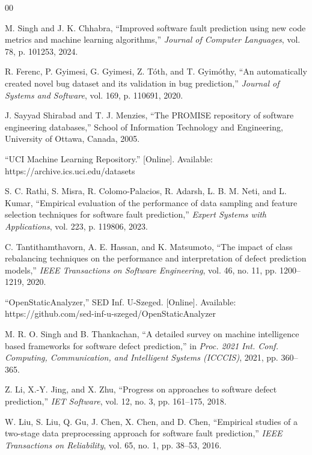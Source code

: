\documentclass[conference,a4paper]{IEEEtran}
\begin{document}
\begin{thebibliography}{00}

 M. Singh and J. K. Chhabra, ``Improved software fault prediction using new code metrics and machine learning algorithms,'' \textit{Journal of Computer Languages}, vol. 78, p. 101253, 2024.

 R. Ferenc, P. Gyimesi, G. Gyimesi, Z. T{\'o}th, and T. Gyim{\'o}thy, ``An automatically created novel bug dataset and its validation in bug prediction,'' \textit{Journal of Systems and Software}, vol. 169, p. 110691, 2020.

 J. Sayyad Shirabad and T. J. Menzies, ``The PROMISE repository of software engineering databases,'' School of Information Technology and Engineering, University of Ottawa, Canada, 2005.

 ``UCI Machine Learning Repository.'' [Online]. Available: https://archive.ics.uci.edu/datasets

 S. C. Rathi, S. Misra, R. Colomo-Palacios, R. Adarsh, L. B. M. Neti, and L. Kumar, ``Empirical evaluation of the performance of data sampling and feature selection techniques for software fault prediction,'' \textit{Expert Systems with Applications}, vol. 223, p. 119806, 2023.

 C. Tantithamthavorn, A. E. Hassan, and K. Matsumoto, ``The impact of class rebalancing techniques on the performance and interpretation of defect prediction models,'' \textit{IEEE Transactions on Software Engineering}, vol. 46, no. 11, pp. 1200--1219, 2020.

 ``OpenStaticAnalyzer,'' SED Inf. U-Szeged. [Online]. Available: https://github.com/sed-inf-u-szeged/OpenStaticAnalyzer

 M. R. O. Singh and B. Thankachan, ``A detailed survey on machine intelligence based frameworks for software defect prediction,'' in \textit{Proc. 2021 Int. Conf. Computing, Communication, and Intelligent Systems (ICCCIS)}, 2021, pp. 360--365.

 Z. Li, X.-Y. Jing, and X. Zhu, ``Progress on approaches to software defect prediction,'' \textit{IET Software}, vol. 12, no. 3, pp. 161--175, 2018.

 W. Liu, S. Liu, Q. Gu, J. Chen, X. Chen, and D. Chen, ``Empirical studies of a two-stage data preprocessing approach for software fault prediction,'' \textit{IEEE Transactions on Reliability}, vol. 65, no. 1, pp. 38--53, 2016.


\end{thebibliography}
\end{document}

